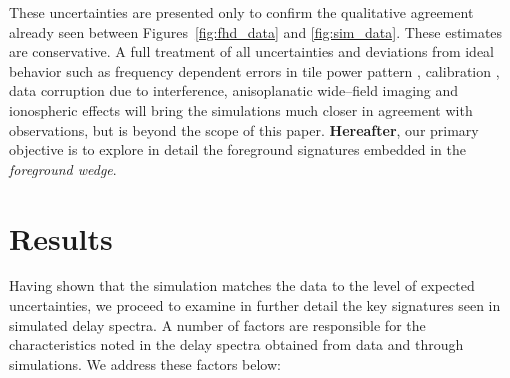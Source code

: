 \documentclass[preprint2,iop,numberedappendix]{emulateapj}
\begin{document}
These uncertainties are presented only to confirm the qualitative agreement already seen between Figures~\ref{fig:fhd_data} and \ref{fig:sim_data}. These estimates are conservative. A full treatment of all uncertainties and deviations from ideal behavior such as frequency dependent errors in tile power pattern \citep{ber14}, calibration \citep{dat10}, data corruption due to interference, anisoplanatic wide--field imaging and ionospheric effects \citep{int09} will bring the simulations much closer in agreement with observations, but is beyond the scope of this paper. {\bf Hereafter}, our primary objective is to explore in detail the foreground signatures embedded in the {\it foreground wedge}.

\section{Results}\label{sec:delay-spectrum-analysis}

Having shown that the simulation matches the data to the level of expected uncertainties, we proceed to examine in further detail the key signatures seen in simulated delay spectra. A number of factors are responsible for the characteristics noted in the delay spectra obtained from data and through simulations. We address these factors below: 
\end{document}
